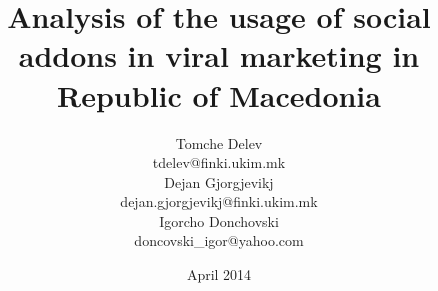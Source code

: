 

\author[T. Delev, D. Gjorgjevikj \and I. Donchovski]{Tomche
Delev\\tdelev@finki.ukim.mk\\Dejan
Gjorgjevikj\\dejan.gjorgjevikj@finki.ukim.mk\\
Igorcho Donchovski\\doncovski\_igor@yahoo.com} \title[AUSAVMRM]{Analysis of the
usage of social addons in viral marketing in Republic of Macedonia}
\date{April 2014}



\frame[t,plain]{\titlepage}





